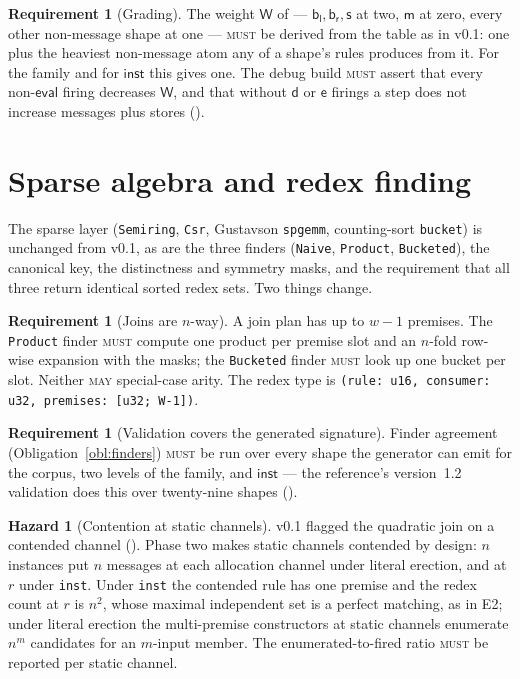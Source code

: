\documentclass[11pt,a4paper]{article}
\newcommand{\code}[1]{\texttt{#1}}
\newcommand{\MUST}{\textsc{must}}
\newcommand{\MAY}{\textsc{may}}
\newcommand{\mm}{\mathsf{m}}
\newcommand{\dd}{\mathsf{d}}
\newcommand{\bl}{\mathsf{b}_{\mathsf{l}}}
\newcommand{\br}{\mathsf{b}_{\mathsf{r}}}
\newcommand{\sy}{\mathsf{s}}
\newcommand{\ev}{\mathsf{e}}
\newcommand{\Wt}{\mathsf{W}}
\theoremstyle{definition}
\newtheorem{requirement}[definition]{Requirement}
\newtheorem{hazard}[definition]{Hazard}
\theoremstyle{plain}
\newcommand{\inst}{\mathsf{inst}}
\begin{document}
\begin{requirement}[Grading]\label{req:grading}
The weight $\Wt$ of \cite[Lem.~9.2]{draft3} --- $\bl,\br,\sy$ at two, $\mm$ at
zero, every other non-message shape at one --- \MUST{} be derived from the
table as in v0.1: one plus the heaviest non-message atom any of a shape's
rules produces from it. For the family and for $\inst$ this gives one. The
debug build \MUST{} assert that every non-$\mathsf{eval}$ firing decreases
$\Wt$, and that without $\dd$ or $\ev$ firings a step does not increase
messages plus stores (\cite[Thm.~6.1(iii)]{matnote}).
\end{requirement}

\section{Sparse algebra and redex finding}\label{sec:finders}

The sparse layer (\code{Semiring}, \code{Csr}, Gustavson \code{spgemm},
counting-sort \code{bucket}) is unchanged from v0.1, as are the three finders
(\code{Naive}, \code{Product}, \code{Bucketed}), the canonical key, the
distinctness and symmetry masks, and the requirement that all three return
identical sorted redex sets. Two things change.

\begin{requirement}[Joins are $n$-way]\label{req:nway}
A join plan has up to $w-1$ premises. The \code{Product} finder \MUST{}
compute one product per premise slot and an $n$-fold row-wise expansion with
the masks; the \code{Bucketed} finder \MUST{} look up one bucket per slot.
Neither \MAY{} special-case arity. The redex type is
\code{(rule: u16, consumer: u32, premises: [u32; W-1])}.
\end{requirement}

\begin{requirement}[Validation covers the generated signature]\label{req:validate}
Finder agreement (Obligation~\ref{obl:finders}) \MUST{} be run over every
shape the generator can emit for the corpus, two levels of the family, and
$\inst$ --- the reference's version~1.2 validation does this over
twenty-nine shapes (\cite[Find.~10.1]{matnote}).
\end{requirement}

\begin{hazard}[Contention at static channels]\label{haz:statics}
v0.1 flagged the quadratic join on a contended channel
(\cite[Rem.~7.2]{matnote}). Phase two makes static channels contended by
design: $n$ instances put $n$ messages at each allocation channel under
literal erection, and at $r$ under \code{inst}. Under \code{inst} the
contended rule has one premise and the redex count at $r$ is $n^{2}$, whose
maximal independent set is a perfect matching, as in E2; under literal
erection the multi-premise constructors at static channels enumerate
$n^{m}$ candidates for an $m$-input member. The enumerated-to-fired ratio
\MUST{} be reported per static channel.
\end{hazard}
\end{document}
